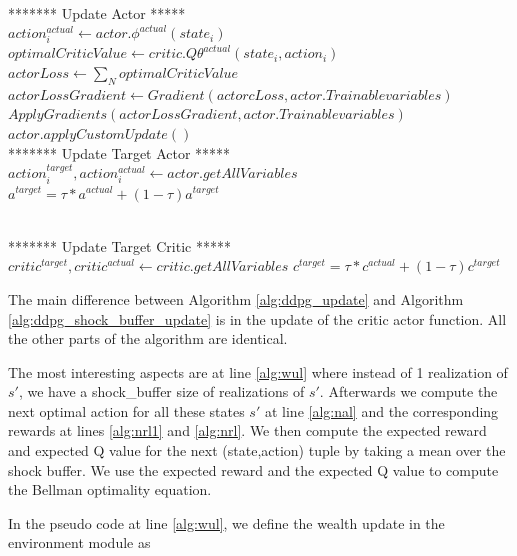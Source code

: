 \begin{breakablealgorithm}
\begin{algorithmic}[1]
\State \\******* Update Actor  *****\\
    \State $action_i^{actual} \gets actor.\phi^{actual}(state_i)$
    \State $optimalCriticValue \gets critic.Q\theta^{actual}(state_i,action_i)$
    \State $actorLoss \gets \sum_N optimalCriticValue $ 
    \State $actorLossGradient \gets Gradient(actorcLoss,actor.Trainablevariables)$
    \State $ApplyGradients(actorLossGradient,actor.Trainablevariables)$
\Else
    \State $actor.applyCustomUpdate()$ 
\EndIf
\State \\******* Update Target Actor  *****\\
\State $action_i^{target},action_i^{actual} \gets actor.getAllVariables$
        \State $a^{target} = \tau*a^{actual}+(1-\tau)a^{target}$
\EndFor

\State \\******* Update Target Critic  *****\\
\State $critic^{target},critic^{actual} \gets critic.getAllVariables$
        \State $c^{target} = \tau*c^{actual}+(1-\tau)c^{target}$
\EndFor
\end{algorithmic}
\end{breakablealgorithm}

The main difference between Algorithm \ref{alg:ddpg_update} and Algorithm \ref{alg:ddpg_shock_buffer_update} is in  the update of the critic actor function. All the other parts of the algorithm are identical.

The most interesting aspects are at line \ref{alg:wul} where instead of 1 realization of $s'$, we have a shock\_buffer size of realizations of $s'$. Afterwards we compute the next optimal action for all these states $s'$ at line \ref{alg:nal} and the corresponding rewards at lines \ref{alg:nrl1} and \ref{alg:nrl}. We then compute the expected reward and expected Q value for the next (state,action) tuple by taking a mean over the shock buffer. We use the expected reward and the expected Q value to compute the Bellman optimality equation.

In the pseudo code at line  \ref{alg:wul}, we define the wealth update in the environment module as 

